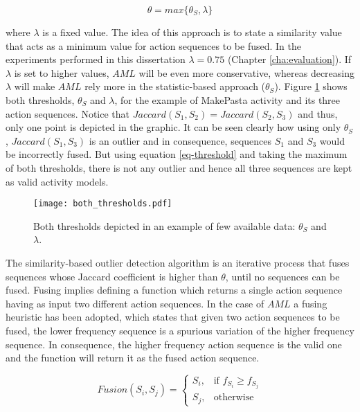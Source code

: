 \begin{equation}
\label{eq-threshold}
 \theta = max \{ \theta_S, \lambda \}
\end{equation}

\noindent where $\lambda$ is a fixed value. The idea of this approach is to state a similarity value that acts as a minimum value for action sequences to be fused. In the experiments performed in this dissertation $\lambda = 0.75$ (Chapter \ref{cha:evaluation}). If $\lambda$ is set to higher values, $AML$ will be even more conservative, whereas decreasing $\lambda$ will make $AML$ rely more in the statistic-based approach ($\theta_S$). Figure \ref{fig-both-thresholds} shows both thresholds, $\theta_S$ and $\lambda$, for the example of MakePasta activity and its three action sequences. Notice that $Jaccard(S_1, S_2) = Jaccard(S_2, S_3)$ and thus, only one point is depicted in the graphic. It can be seen clearly how using only $\theta_S$, $Jaccard(S_1, S_3)$ is an outlier and in consequence, sequences $S_1$ and $S_3$ would be incorrectly fused. But using equation \ref{eq-threshold} and taking the maximum of both thresholds, there is not any outlier and hence all three sequences are kept as valid activity models. 

\begin{figure}[htbp]
\centering
\texttt{[image: both\_thresholds.pdf]}
    \caption{Both thresholds depicted in an example of few available data: $\theta_S$ and $\lambda$.}
    \label{fig-both-thresholds}
\end{figure}

The similarity-based outlier detection algorithm is an iterative process that fuses sequences whose Jaccard coefficient is higher than $\theta$, until no sequences can be fused. Fusing implies defining a function which returns a single action sequence having as input two different action sequences. In the case of $AML$ a fusing heuristic has been adopted, which states that given two action sequences to be fused, the lower frequency sequence is a spurious variation of the higher frequency sequence. In consequence, the higher frequency action sequence is the valid one and the function will return it as the fused action sequence. 

\begin{equation}
\label{eq-fusion}
 Fusion(S_i, S_j) = \left\{
\begin{array}{cc}
 S_i, & \mbox{if } f_{S_i} \geq f_{S_j} \\
 S_j, & \mbox{otherwise}
\end{array}
\right.
\end{equation}

